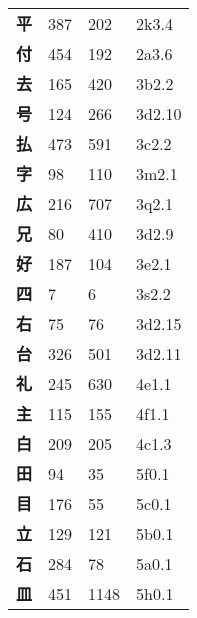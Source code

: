 \begin{longtable}[c]{llll}
    \bfseries 平 & 387 & 202 & 2k3.4\\
    \bfseries 付 & 454 & 192 & 2a3.6\\
    \bfseries 去 & 165 & 420 & 3b2.2\\
    \bfseries 号 & 124 & 266 & 3d2.10\\
    \bfseries 払 & 473 & 591 & 3c2.2\\
    \bfseries 字 & 98 & 110 & 3m2.1\\
    \bfseries 広 & 216 & 707 & 3q2.1\\
    \bfseries 兄 & 80 & 410 & 3d2.9\\
    \bfseries 好 & 187 & 104 & 3e2.1\\
    \bfseries 四 & 7 & 6 & 3s2.2\\
    \bfseries 右 & 75 & 76 & 3d2.15\\
    \bfseries 台 & 326 & 501 & 3d2.11\\
    \bfseries 礼 & 245 & 630 & 4e1.1\\
    \bfseries 主 & 115 & 155 & 4f1.1\\
    \bfseries 白 & 209 & 205 & 4c1.3\\
    \bfseries 田 & 94 & 35 & 5f0.1\\
    \bfseries 目 & 176 & 55 & 5c0.1\\
    \bfseries 立 & 129 & 121 & 5b0.1\\
    \bfseries 石 & 284 & 78 & 5a0.1\\
    \bfseries 皿 & 451 & 1148 & 5h0.1\\
  \end{longtable}
